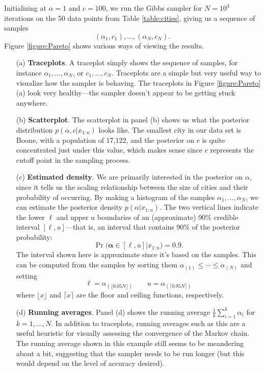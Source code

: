 \documentclass[12pt]{article}
\begin{document}
Initializing at $\alpha = 1$ and $c = 100$, we run the Gibbs sampler for $N = 10^3$ iterations on the 50 data points from Table \ref{table:cities}, giving us a sequence of samples
$$ (\alpha_1,c_1),\ldots,(\alpha_N,c_N). $$
Figure \ref{figure:Pareto} shows various ways of viewing the results. 
\begin{itemize}
\item[(a)] \textbf{Traceplots}. A traceplot simply shows the sequence of samples, for instance $\alpha_1,\ldots,\alpha_N$, or $c_1,\ldots, c_N$. Traceplots are a simple but very useful way to visualize how the sampler is behaving. The traceplots in Figure \ref{figure:Pareto}(a) look very healthy---the sampler doesn't appear to be getting stuck anywhere.
\item[(b)] \textbf{Scatterplot}. The scatterplot in panel (b) shows us what the posterior distribution $p(\alpha, c|x_{1:n})$ looks like. The smallest city in our data set is Boone, with a population of 17,122, and the posterior on $c$ is quite concentrated just under this value, which makes sense since $c$ represents the cutoff point in the sampling process.
\item[(c)] \textbf{Estimated density}. We are primarily interested in the posterior on $\alpha$, since it tells us the scaling relationship between the size of cities and their probability of occurring. By making a histogram of the samples $\alpha_1,\ldots,\alpha_N$, we can estimate the posterior density $p(\alpha|x_{1:n})$. The two vertical lines indicate the lower $\ell$ and upper $u$ boundaries of an (approximate) 90\% credible interval $[\ell,u]$---that is, an interval that contains 90\% of the posterior probability:
$$\Pr\big(\bm\alpha\in [\ell, u] \big\vert x_{1:n}\big) = 0.9. $$
The interval shown here is approximate since it's based on the samples. 
This can be computed from the samples by sorting them $\alpha_{(1)}\leq \cdots\leq\alpha_{(N)}$ and setting
$$\ell = \alpha_{(\lfloor 0.05 N\rfloor)}  \qquad u = \alpha_{(\lceil 0.95 N\rceil)} $$
where $\lfloor x\rfloor$ and $\lceil x\rceil$ are the floor and ceiling functions, respectively.
\item[(d)] \textbf{Running averages}. Panel (d) shows the running average $\frac{1}{k}\sum_{i = 1}^k\alpha_i$ for $k = 1,\ldots,N$. In addition to traceplots, running averages such as this are a useful heuristic for visually assessing the convergence of the Markov chain. The running average shown in this example still seems to be meandering about a bit, suggesting that the sampler needs to be run longer (but this would depend on the level of accuracy desired).

\end{itemize}
\end{document}
